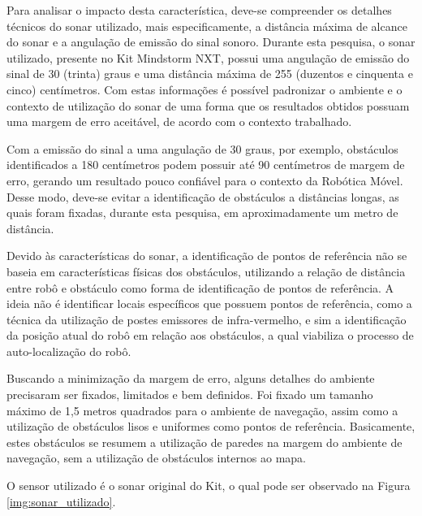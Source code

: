   Para analisar o impacto desta característica, deve-se compreender os detalhes técnicos do sonar utilizado, mais especificamente,
  a distância máxima de alcance do sonar e a angulação de emissão do sinal sonoro. Durante esta pesquisa, o
  sonar utilizado, presente no Kit Mindstorm NXT, possui uma angulação de emissão do sinal de 30 (trinta) graus e uma distância máxima de
  255 (duzentos e cinquenta e cinco) centímetros. Com estas informações é possível padronizar o ambiente e o contexto de utilização do sonar
  de uma forma que os resultados obtidos possuam uma margem de erro aceitável, de acordo com o contexto trabalhado.

  Com a emissão do sinal a uma angulação de 30 graus, por exemplo, obstáculos identificados a 180 centímetros podem possuir até 90
  centímetros de margem de erro, gerando um resultado pouco confiável para o contexto da Robótica Móvel. Desse modo, deve-se evitar
  a identificação de obstáculos a distâncias longas, as quais foram fixadas, durante esta pesquisa, em aproximadamente um metro de distância.

  Devido às características do sonar, a identificação de pontos de referência não se baseia em características físicas dos obstáculos,
  utilizando a relação de distância entre robô e obstáculo como forma de identificação de pontos de referência. A ideia não é
  identificar locais específicos que possuem pontos de referência, como a técnica da utilização de postes emissores de infra-vermelho,
  e sim a identificação da posição atual do robô em relação aos obstáculos, a qual viabiliza o processo de auto-localização do robô.

  Buscando a minimização da margem de erro, alguns detalhes do ambiente precisaram ser fixados, limitados e bem definidos. Foi fixado
  um tamanho máximo de 1,5 metros quadrados para o ambiente de navegação, assim como a utilização de obstáculos lisos e uniformes como
  pontos de referência. Basicamente, estes obstáculos se resumem a utilização de paredes na margem do ambiente de navegação, sem a utilização
  de obstáculos internos ao mapa.

  O sensor utilizado é o sonar original do Kit, o qual pode ser observado na Figura \ref{img:sonar_utilizado}.


